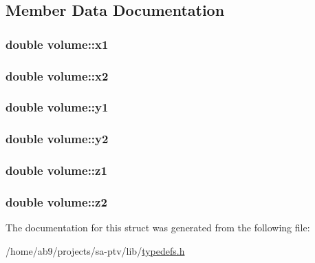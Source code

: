 \subsection{Member Data Documentation}
\hypertarget{structvolume_a67e3a66484093a6ec6946824d3fd5fd5}{
\subsubsection[{x1}]{\setlength{\rightskip}{0pt plus 5cm}double volume\-::x1}}\label{da/d4c/structvolume_a67e3a66484093a6ec6946824d3fd5fd5}
\hypertarget{structvolume_aea372c2df8c4172fcbe94ccb00f2f41c}{
\subsubsection[{x2}]{\setlength{\rightskip}{0pt plus 5cm}double volume\-::x2}}\label{da/d4c/structvolume_aea372c2df8c4172fcbe94ccb00f2f41c}
\hypertarget{structvolume_a2f927294450145289da7bcb8ed6d2fc2}{
\subsubsection[{y1}]{\setlength{\rightskip}{0pt plus 5cm}double volume\-::y1}}\label{da/d4c/structvolume_a2f927294450145289da7bcb8ed6d2fc2}
\hypertarget{structvolume_a24d8999d68967311704e2899d4566a66}{
\subsubsection[{y2}]{\setlength{\rightskip}{0pt plus 5cm}double volume\-::y2}}\label{da/d4c/structvolume_a24d8999d68967311704e2899d4566a66}
\hypertarget{structvolume_a4d9121fcbb4204419b5e74eafa2d300b}{
\subsubsection[{z1}]{\setlength{\rightskip}{0pt plus 5cm}double volume\-::z1}}\label{da/d4c/structvolume_a4d9121fcbb4204419b5e74eafa2d300b}
\hypertarget{structvolume_af1e16b7b95e7b579b015634d911090eb}{
\subsubsection[{z2}]{\setlength{\rightskip}{0pt plus 5cm}double volume\-::z2}}\label{da/d4c/structvolume_af1e16b7b95e7b579b015634d911090eb}


The documentation for this struct was generated from the following file\-:\begin{DoxyCompactItemize}
\item 
/home/ab9/projects/sa-\/ptv/lib/\hyperlink{typedefs_8h}{typedefs.\-h}\end{DoxyCompactItemize}
